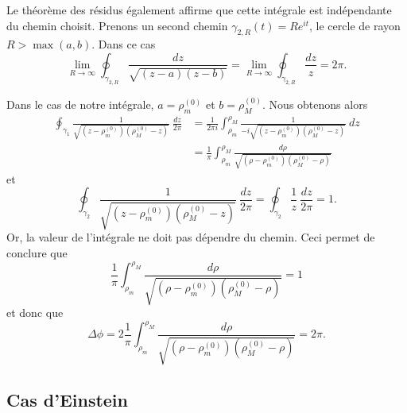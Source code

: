 \documentclass[a4paper,11pt]{report}
\begin{document}
            Le théorème des résidus également affirme que cette intégrale est indépendante du chemin choisit. Prenons un second chemin $\gamma_{2,R}(t) = Re^{it}$, le cercle de rayon $R>\max(a,b)$. Dans ce cas
            \begin{equation}
                \lim\limits_{R\to\infty} \oint_{\gamma_{2,R}}\frac{dz}{\sqrt{\left( z-a \right)\left( z-b \right)}} = \lim\limits_{R\to\infty}\oint_{\gamma_{2,R}}\frac{dz}{z} = 2\pi.
            \end{equation}
            
            Dans le cas de notre intégrale, $a = \rho^{(0)}_m$ et $b = \rho^{(0)}_M$. Nous obtenons alors
            \begin{align}
                \oint_{\gamma_1} \frac{1}{\sqrt{\left( z-\rho^{(0)}_m \right)\left( \rho^{(0)}_M-z \right)}}~\frac{dz}{2\pi} &= \frac{1}{2\pi i} \int^{\rho_M}_{\rho_m}\frac{1}{-i\sqrt{\left( z-\rho^{(0)}_m \right)\left( \rho^{(0)}_M-z \right)}}~dz\\
                &= \frac{1}{\pi} \int^{\rho_M}_{\rho_m}\frac{d\rho}{\sqrt{\left( \rho-\rho^{(0)}_m \right)\left( \rho^{(0)}_M-\rho \right)}}
            \end{align}
            et
            \begin{equation}
                \oint_{\gamma_2} \frac{1}{\sqrt{\left( z-\rho^{(0)}_m \right)\left( \rho^{(0)}_M-z \right)}}~\frac{dz}{2\pi} = \oint_{\gamma_2}\frac{1}{z}~\frac{dz}{2\pi} = 1.
            \end{equation}
            Or, la valeur de l'intégrale ne doit pas dépendre du chemin. Ceci permet de conclure que
            \begin{equation}
                \frac{1}{\pi} \int^{\rho_M}_{\rho_m}\frac{d\rho}{\sqrt{\left( \rho-\rho^{(0)}_m \right)\left( \rho^{(0)}_M-\rho \right)}} = 1
            \end{equation}
            et donc que
            \begin{equation}
                \Delta\phi = 2 \frac{1}{\pi} \int^{\rho_M}_{\rho_m}\frac{d\rho}{\sqrt{\left( \rho-\rho^{(0)}_m \right)\left( \rho^{(0)}_M-\rho \right)}} = 2\pi.
            \end{equation}
        
        \subsection{Cas d'Einstein}
        
\end{document}
